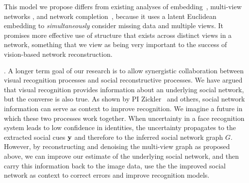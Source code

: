 This model we propose differs from existing analyses of embedding~\cite{Hoff01latentspace,Hancocklatent}, multi-view networks \cite{AiroldiBFX08,Kim12}, and network completion~\cite{Clauset,Guimera,HannekeX09,KimL11}, because it uses a latent Euclidean embedding to \emph{simultaneously} consider missing data and multiple views. It promises more effective use of structure that exists across distinct views in a network, something that we view as being very important to the success of vision-based network reconstruction. 


\label{sec:closeloop}

. A longer term goal of our research is to allow synergistic collaboration between visual recognition processes and social reconstructive processes. We have argued that visual recognition provides information about an underlying social network, but the converse is also true. As shown by PI Zickler~\cite{Stone2008,Stone2010} and others, social network information can serve as context to improve recognition. We imagine a future in which these two processes work together. When uncertainty in a face recognition system leads to low confidence in identities, the uncertainty propagates to the extracted social cues ${\bf y}$ and therefore to the inferred social network graph $G$. However, by reconstructing and denoising the multi-view graph as proposed above, we can improve our estimate of the underlying social network, and then carry this information back to the image data, use the the improved social network as context to correct  errors and improve recognition models.
